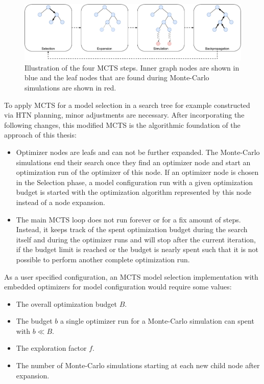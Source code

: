 \begin{figure}[ht!]
    \centering
    \includegraphics[width=\textwidth]{gfx/Figures/Approach/MCTS.pdf}
    \caption[Illustration of the four MCTS steps.]{Illustration of the four MCTS steps. Inner graph nodes are shown in blue and the leaf nodes that are found during Monte-Carlo simulations are shown in red.}
    \label{fig:approach:mcts}
\end{figure}

To apply MCTS for a model selection in a search tree for example constructed via HTN planning, minor adjustments are necessary.
After incorporating the following changes, this modified MCTS is the algorithmic foundation of the approach of this thesis:
\begin{itemize}
    \item Optimizer nodes are leafs and can not be further expanded. The Monte-Carlo simulations end their search once they find an optimizer node and start an optimization run of the optimizer of this node. If an optimizer node is chosen in the Selection phase, a model configuration run with a given optimization budget is started with the optimization algorithm represented by this node instead of a node expansion.
    \item The main MCTS loop does not run forever or for a fix amount of steps. Instead, it keeps track of the spent optimization budget during the search itself and during the optimizer runs and will stop after the current iteration, if the budget limit is reached or the budget is nearly spent such that it is not possible to perform another complete optimization run.
\end{itemize}
As a user specified configuration, an MCTS model selection implementation with embedded optimizers for model configuration would require some values:
\begin{itemize}
    \item The overall optimization budget $B$.
    \item The budget $b$ a single optimizer run for a Monte-Carlo simulation can spent with $b \ll B$.
    \item The exploration factor $f$.
    \item The number of Monte-Carlo simulations starting at each new child node after expansion.
\end{itemize}
